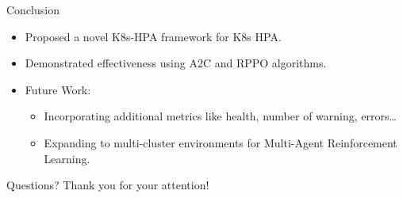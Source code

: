 \documentclass{beamer}
\begin{document}
\begin{frame}{Conclusion}
    \begin{itemize}
        \item Proposed a novel K8s-HPA framework for K8s HPA.
        \item Demonstrated effectiveness using A2C and RPPO algorithms.
        \item Future Work:
        \begin{itemize}
            \item Incorporating additional metrics like health, number of warning, errors\dots
            \item Expanding to multi-cluster environments for Multi-Agent Reinforcement Learning.
        \end{itemize}
    \end{itemize}
\end{frame}

\begin{frame}{Questions?}
    \centering
    Thank you for your attention! \\
\end{frame}
\end{document}

